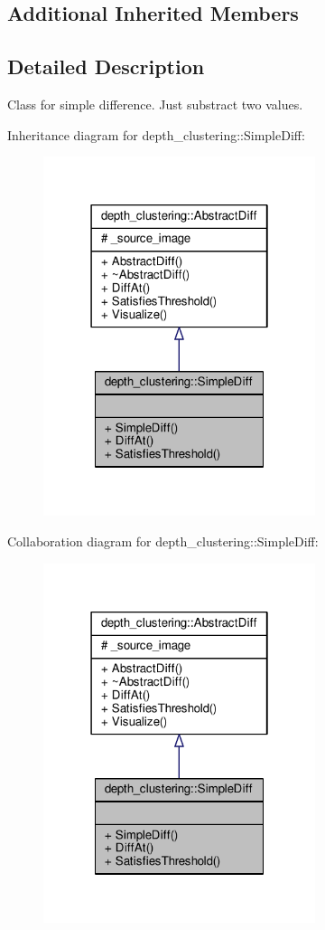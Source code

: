 \subsection*{Additional Inherited Members}


\subsection{Detailed Description}
Class for simple difference. Just substract two values. 

Inheritance diagram for depth\-\_\-clustering\-:\-:Simple\-Diff\-:
\nopagebreak
\begin{figure}[H]
\begin{center}
\leavevmode
\includegraphics[width=226pt]{classdepth__clustering_1_1SimpleDiff__inherit__graph}
\end{center}
\end{figure}


Collaboration diagram for depth\-\_\-clustering\-:\-:Simple\-Diff\-:
\nopagebreak
\begin{figure}[H]
\begin{center}
\leavevmode
\includegraphics[width=226pt]{classdepth__clustering_1_1SimpleDiff__coll__graph}
\end{center}
\end{figure}


